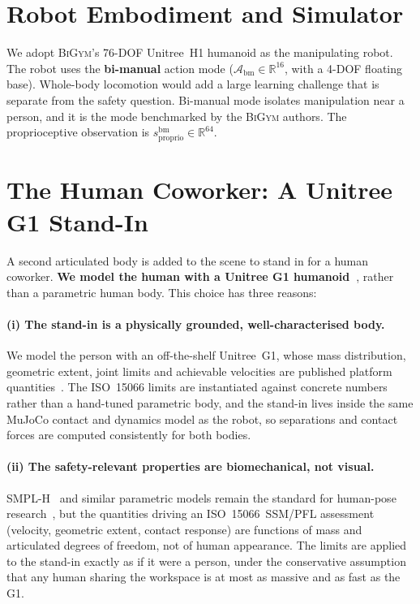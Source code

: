 \documentclass[11pt,a4paper]{report}
\newcommand{\ssm}{SSM}
\newcommand{\pfl}{PFL}
\newcommand{\iso}{ISO~15066}
\newcommand{\bigym}{\textsc{BiGym}}
\begin{document}
\section{Robot Embodiment and Simulator}
\label{sec:bench:embodiment}

We adopt \bigym{}'s 76-DOF Unitree~H1 humanoid as the manipulating
robot. The robot uses the \textbf{bi-manual} action mode
($\mathcal{A}_{\mathrm{bm}} \in \mathbb{R}^{16}$, with a 4-DOF
floating base). Whole-body locomotion would add a large learning
challenge that is separate from the safety question. Bi-manual mode
isolates manipulation near a person, and it is the mode benchmarked by
the \bigym{} authors. The proprioceptive observation is
$s_{\mathrm{proprio}}^{\mathrm{bm}} \in \mathbb{R}^{64}$.

\section{The Human Coworker: A Unitree G1 Stand-In}
\label{sec:bench:human}

A second articulated body is added to the scene to stand in for a human
coworker. \textbf{We model the human with a Unitree G1
humanoid~\cite{unitree_g1}}, rather than a parametric human body. This
choice has three reasons:

\paragraph{(i) The stand-in is a physically grounded, well-characterised body.}
We model the person with an off-the-shelf Unitree~G1, whose mass
distribution, geometric extent, joint limits and achievable
velocities are published platform quantities~\cite{unitree_g1}. The
\iso{} limits are instantiated against concrete numbers rather than
a hand-tuned parametric body, and the stand-in lives inside the same
MuJoCo contact and dynamics model as the robot, so separations and
contact forces are computed consistently for both bodies.

\paragraph{(ii) The safety-relevant properties are biomechanical, not visual.}
SMPL-H~\cite{romero2017smplh} and similar parametric models remain
the standard for human-pose research~\cite{tian2023meshsurvey}, but
the quantities driving an
\iso{}~\ssm{}/\pfl{} assessment (velocity, geometric extent, contact
response) are functions of mass and articulated degrees of freedom,
not of human appearance. The limits are applied to the stand-in
exactly as if it were a person, under the conservative assumption
that any human sharing the workspace is at most as massive and as
fast as the G1.
\end{document}
